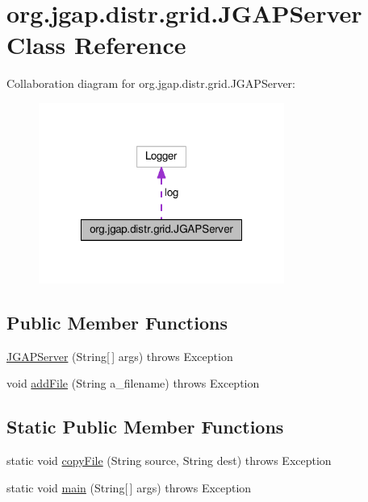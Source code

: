 \hypertarget{classorg_1_1jgap_1_1distr_1_1grid_1_1_j_g_a_p_server}{\section{org.\-jgap.\-distr.\-grid.\-J\-G\-A\-P\-Server Class Reference}
\label{classorg_1_1jgap_1_1distr_1_1grid_1_1_j_g_a_p_server}
}


Collaboration diagram for org.\-jgap.\-distr.\-grid.\-J\-G\-A\-P\-Server\-:
\nopagebreak
\begin{figure}[H]
\begin{center}
\leavevmode
\includegraphics[width=228pt]{classorg_1_1jgap_1_1distr_1_1grid_1_1_j_g_a_p_server__coll__graph}
\end{center}
\end{figure}
\subsection*{Public Member Functions}
\begin{DoxyCompactItemize}
\item 
\hyperlink{classorg_1_1jgap_1_1distr_1_1grid_1_1_j_g_a_p_server_adfc0911c30d76263a09d0296ebbf6428}{J\-G\-A\-P\-Server} (String\mbox{[}$\,$\mbox{]} args)  throws Exception 
\item 
void \hyperlink{classorg_1_1jgap_1_1distr_1_1grid_1_1_j_g_a_p_server_a68b6afc68a06c87a4a70d8b6db47bcca}{add\-File} (String a\-\_\-filename)  throws Exception 
\end{DoxyCompactItemize}
\subsection*{Static Public Member Functions}
\begin{DoxyCompactItemize}
\item 
static void \hyperlink{classorg_1_1jgap_1_1distr_1_1grid_1_1_j_g_a_p_server_a49f7fe42fd3b16f50a2bd8b21c2d5092}{copy\-File} (String source, String dest)  throws Exception 
\item 
static void \hyperlink{classorg_1_1jgap_1_1distr_1_1grid_1_1_j_g_a_p_server_aa4ef7b07a1fa424c267813eda3c6fbe3}{main} (String\mbox{[}$\,$\mbox{]} args)  throws Exception 
\end{DoxyCompactItemize}
